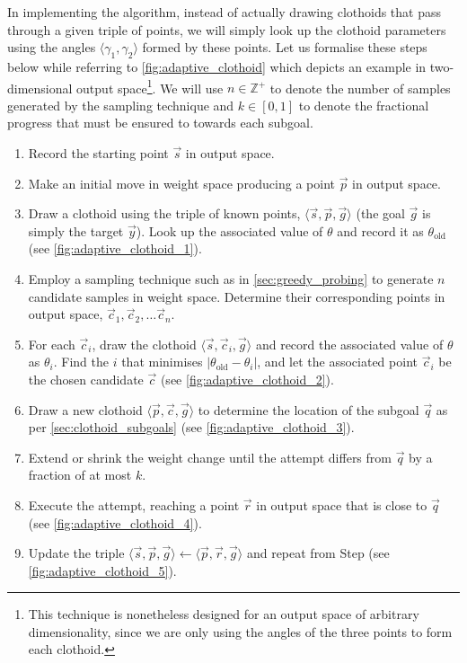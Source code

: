 In implementing the algorithm, instead of actually drawing clothoids that pass through a given triple of points, we will simply look up the clothoid parameters using the angles $\langle \gamma_1, \gamma_2 \rangle$ formed by these points.
Let us formalise these steps below while referring to \ref{fig:adaptive_clothoid} which depicts an example in two-dimensional output space\footnote{This technique is nonetheless designed for an output space of arbitrary dimensionality, since we are only using the angles of the three points to form each clothoid.}.
We will use $n \in \mathbb{Z}^+$ to denote the number of samples generated by the sampling technique and $k \in [0, 1]$ to denote the fractional progress that must be ensured to towards each subgoal.
\begin{enumerate}
    \item 
        Record the starting point $\vec{s}$ in output space.
    \item 
        Make an initial move in weight space producing a point $\vec{p}$ in output space.
    \item \label{li:adaptive_clothoid_draw_initial}
        Draw a clothoid using the triple of known points, $\langle \vec{s}, \vec{p}, \vec{g} \rangle$ (the goal $\vec{g}$ is simply the target $\vec{y}$).
        Look up the associated value of $\theta$ and record it as $\theta_\text{old}$ (see \ref{fig:adaptive_clothoid_1}).
    \item 
        Employ a sampling technique such as in \ref{sec:greedy_probing} to generate $n$ candidate samples in weight space.
        Determine their corresponding points in output space, $\vec{c}_1,\vec{c}_2,\dots\vec{c}_n$.
    \item \label{li:adaptive_clothoid_candidate_selection}
        For each $\vec{c}_i$, draw the clothoid $\langle \vec{s}, \vec{c}_i, \vec{g} \rangle$ and record the associated value of $\theta$ as $\theta_i$.
        Find the $i$ that minimises $|\theta_\text{old} - \theta_i|$, and let the associated point $\vec{c}_i$ be the chosen candidate $\vec{c}$ (see \ref{fig:adaptive_clothoid_2}).
    \item 
        Draw a new clothoid $\langle \vec{p}, \vec{c}, \vec{g} \rangle$ to determine the location of the subgoal $\vec{q}$ as per \ref{sec:clothoid_subgoals} (see \ref{fig:adaptive_clothoid_3}).
    \item 
        Extend or shrink the weight change until the attempt differs from $\vec{q}$ by a fraction of at most $k$.
    \item 
        Execute the attempt, reaching a point $\vec{r}$ in output space that is close to $\vec{q}$ (see \ref{fig:adaptive_clothoid_4}). 
    \item 
        Update the triple $\langle \vec{s}, \vec{p}, \vec{g} \rangle \gets \langle \vec{p}, \vec{r}, \vec{g} \rangle$ and repeat from Step  (see \ref{fig:adaptive_clothoid_5}).
\end{enumerate}
